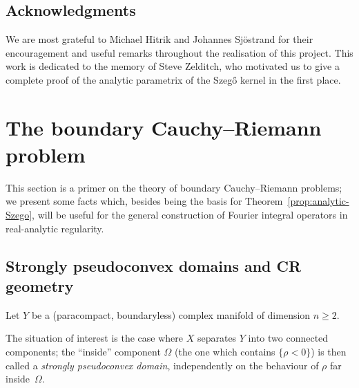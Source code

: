 \documentclass[AHL,Unicode,longabstracts,published]{cedram}
\makeatletter
\newcommand\1{\mathds{1}}
\newcommand{\R}{\mathbb{R}}
\newcommand{\dd}{\mathrm{d}}
\let\save@mathaccent\mathaccent
\newcommand*\if@single[3]{%
  \setbox0\hbox{${\mathaccent"0362{#1}}^H$}%
  \setbox2\hbox{${\mathaccent"0362{\kern0pt#1}}^H$}%
  \ifdim\ht0=\ht2 #3\else #2\fi
  }
\newcommand*\rel@kern[1]{\kern#1\dimexpr\macc@kerna}
\newcommand*\widebar[1]{\@ifnextchar^{{\wide@bar{#1}{0}}}{\wide@bar{#1}{1}}}
\newcommand*\wide@bar[2]{\if@single{#1}{\wide@bar@{#1}{#2}{1}}{\wide@bar@{#1}{#2}{2}}}
\newcommand*\wide@bar@[3]{%
  \begingroup
  \def\mathaccent##1##2{%
    \let\mathaccent\save@mathaccent
    \if#32 \let\macc@nucleus\first@char \fi
    \setbox\z@\hbox{$\macc@style{\macc@nucleus}_{}$}%
    \setbox\tw@\hbox{$\macc@style{\macc@nucleus}{}_{}$}%
    \dimen@\wd\tw@
    \advance\dimen@-\wd\z@
    \divide\dimen@ 3
    \@tempdima\wd\tw@
    \advance\@tempdima-\scriptspace
    \divide\@tempdima 10
    \advance\dimen@-\@tempdima
    \ifdim\dimen@>\z@ \dimen@0pt\fi
    \rel@kern{0.6}\kern-\dimen@
    \if#31
      \overline{\rel@kern{-0.6}\kern\dimen@\macc@nucleus\rel@kern{0.4}\kern\dimen@}%
      \advance\dimen@0.4\dimexpr\macc@kerna
      \let\final@kern#2%
      \ifdim\dimen@<\z@ \let\final@kern1\fi
      \if\final@kern1 \kern-\dimen@\fi
    \else
      \overline{\rel@kern{-0.6}\kern\dimen@#1}%
    \fi
  }%
  \macc@depth\@ne
  \let\math@bgroup\@empty \let\math@egroup\macc@set@skewchar
  \mathsurround\z@ \frozen@everymath{\mathgroup\macc@group\relax}%
  \macc@set@skewchar\relax
  \let\mathaccentV\macc@nested@a
  \if#31
    \macc@nested@a\relax111{#1}%
  \else
    \def\gobble@till@marker##1\endmarker{}%
    \futurelet\first@char\gobble@till@marker#1\endmarker
    \ifcat\noexpand\first@char A\else
      \def\first@char{}%
    \fi
    \macc@nested@a\relax111{\first@char}%
  \fi
  \endgroup
}
\let\oldbar\bar
\renewcommand*{\bar}[1]{{\mathchoice{\widebar{#1}}{\widebar{#1}}{\widebar{#1}}{\oldbar{#1}}}}
\renewcommand*{\to}{\mathchoice{\longrightarrow}{\rightarrow}{\rightarrow}{\rightarrow}}
\makeatother
\begin{document}
\subsection*{Acknowledgments}

We are most grateful to Michael Hitrik and Johannes Sj\"ostrand for their encouragement and useful remarks throughout the realisation of this project.
This work is dedicated to the memory of Steve Zelditch, who motivated us to give a complete proof of the analytic parametrix of the Szeg\H{o} kernel in the first place.

\section{The boundary Cauchy--Riemann problem}\label{sec:bound-cauchy-riem}

This section is a primer on the theory of boundary Cauchy--Riemann problems; we present some facts which, besides being the basis for Theorem~\ref{prop:analytic-Szego}, will be useful for the general construction of Fourier integral operators in real-analytic regularity.

\subsection{Strongly pseudoconvex domains and CR geometry}\label{sec:strongly-pseud-doma}

\begin{defi}\label{def:pseudoconvex}
Let $Y$ be a (paracompact, boundaryless) complex manifold of
dimension $n\geq 2$.
\end{defi}

The situation of interest is the case where $X$ separates $Y$ into two connected components; the ``inside'' component $\Omega$ (the one which contains $\{\rho<0\}$) is then called a \emph{strongly pseudoconvex domain}, independently on the behaviour of $\rho$ far inside~$\Omega$.
\end{document}
